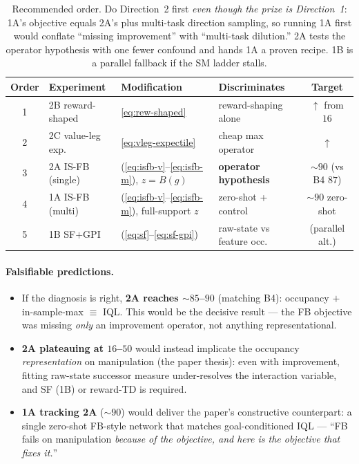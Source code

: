 \documentclass[11pt]{article}
\newcommand{\Bmap}{B}                                %
\begin{document}
\begin{table}[h]
\centering
\small
\begin{tabular}{@{}clllc@{}}
\toprule
\textbf{Order} & \textbf{Experiment} & \textbf{Modification} & \textbf{Discriminates} & \textbf{Target} \\
\midrule
1 & 2B reward-shaped     & \eqref{eq:rew-shaped}                       & reward-shaping alone        & $\uparrow$ from $16$ \\
2 & 2C value-leg exp.\   & \eqref{eq:vleg-expectile}                   & cheap max operator          & $\uparrow$ \\
3 & 2A IS-FB (single)    & (\ref{eq:isfb-v}--\ref{eq:isfb-m}), $z{=}\Bmap(g)$ & \textbf{operator hypothesis} & ${\sim}90$ (vs B4 $87$) \\
4 & 1A IS-FB (multi)     & (\ref{eq:isfb-v}--\ref{eq:isfb-m}), full-support $z$ & zero-shot + control   & ${\sim}90$ zero-shot \\
5 & 1B SF$+$GPI          & (\ref{eq:sf}--\ref{eq:sf-gpi})              & raw-state vs feature occ.\  & (parallel alt.) \\
\bottomrule
\end{tabular}
\caption{Recommended order. Do Direction~2 first \emph{even though the prize is
Direction~1}: 1A's objective equals 2A's plus multi-task direction sampling, so
running 1A first would conflate ``missing improvement'' with ``multi-task
dilution.'' 2A tests the operator hypothesis with one fewer confound and hands 1A
a proven recipe. 1B is a parallel fallback if the SM ladder stalls.}
\label{tab:sequence}
\end{table}

\paragraph{Falsifiable predictions.}
\begin{itemize}[leftmargin=1.4em,itemsep=2pt]
  \item If the diagnosis is right, \textbf{2A reaches ${\sim}85$--$90$} (matching
        B4): occupancy $+$ in-sample-max $\equiv$ IQL. This would be the decisive
        result --- the FB objective was missing \emph{only} an improvement
        operator, not anything representational.
  \item \textbf{2A plateauing at $16$--$50$} would instead implicate the
        occupancy \emph{representation} on manipulation (the paper thesis): even
        with improvement, fitting raw-state successor measure under-resolves the
        interaction variable, and SF (1B) or reward-TD is required.
  \item \textbf{1A tracking 2A} (${\sim}90$) would deliver the paper's
        constructive counterpart: a single zero-shot FB-style network that
        matches goal-conditioned IQL --- ``FB fails on manipulation \emph{because
        of the objective, and here is the objective that fixes it.}''
\end{itemize}
\end{document}

